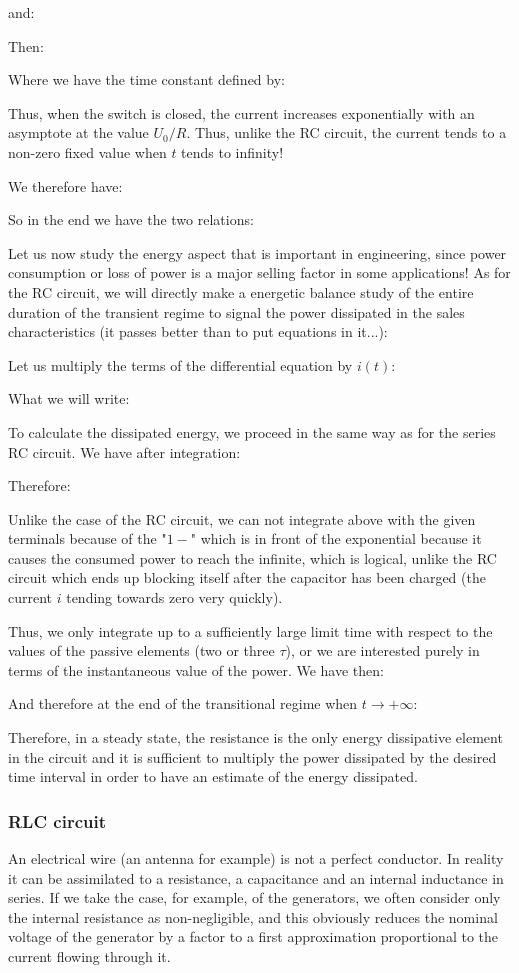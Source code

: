 	and:
	
	Then:
	
	Where we have the time constant defined by:
	
	Thus, when the switch is closed, the current increases exponentially with an asymptote at the value $U_0/R$. Thus, unlike the RC circuit, the current tends to a non-zero fixed value when $t$ tends to infinity!
	
	We therefore have:
	
	So in the end we have the two relations:
	
	Let us now study the energy aspect that is important in engineering, since power consumption or loss of power is a major selling factor in some applications! As for the RC circuit, we will directly make a energetic balance study of the entire duration of the transient regime to signal the power dissipated in the sales characteristics (it passes better than to put equations in it...):
	
	Let us multiply the terms of the differential equation by $i(t)$:
	
	What we will write:
	
	To calculate the dissipated energy, we proceed in the same way as for the series RC circuit. We have after integration:
	
	Therefore:
	
	Unlike the case of the RC circuit, we can not integrate above with the given terminals because of the "$1-$" which is in front of the exponential because it causes the consumed power to reach the infinite, which is logical, unlike the RC circuit which ends up blocking itself after the capacitor has been charged (the current $i$ tending towards zero very quickly).

	Thus, we only integrate up to a sufficiently large limit time with respect to the values of the passive elements (two or three $\tau$), or we are interested purely in terms of the instantaneous value of the power. We have then:
	
	And therefore at the end of the transitional regime when $t\rightarrow +\infty$:
	
	Therefore, in a steady state, the resistance is the only energy dissipative element in the circuit and it is sufficient to multiply the power dissipated by the desired time interval in order to have an estimate of the energy dissipated.
	
	\subsubsection{RLC circuit}
	An electrical wire (an antenna for example) is not a perfect conductor. In reality it can be assimilated to a resistance, a capacitance and an internal inductance in series. If we take the case, for example, of the generators, we often consider only the internal resistance as non-negligible, and this obviously reduces the nominal voltage of the generator by a factor to a first approximation proportional to the current flowing through it.

